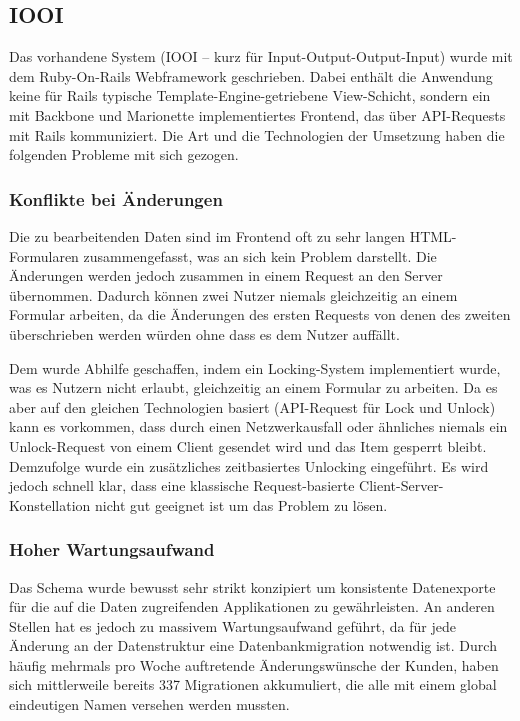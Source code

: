 \subsection{IOOI}
\label{ssec:ep_iooi}

Das vorhandene System (IOOI -- kurz für Input-Output-Output-Input) wurde mit
dem Ruby-On-Rails Webframework geschrieben.  Dabei enthält die Anwendung keine
für Rails typische Template-Engine-getriebene View-Schicht, sondern ein mit
Backbone und Marionette \cite{marionette} implementiertes Frontend, das über
API-Requests mit Rails kommuniziert.  Die Art und die Technologien der Umsetzung
haben die folgenden Probleme mit sich gezogen.

\subsubsection{Konflikte bei Änderungen}
\label{sssec:epv_konflikte_bei_aenderungen}

Die zu bearbeitenden Daten sind im Frontend oft zu sehr langen HTML-Formularen
zusammengefasst, was an sich kein Problem darstellt.  Die Änderungen werden
jedoch zusammen in einem Request an den Server übernommen.  Dadurch können zwei
Nutzer niemals gleichzeitig an einem Formular arbeiten, da die Änderungen des
ersten Requests von denen des zweiten überschrieben werden würden ohne dass es
dem Nutzer auffällt.

Dem wurde Abhilfe geschaffen, indem ein Locking-System implementiert wurde, was
es Nutzern nicht erlaubt, gleichzeitig an einem Formular zu arbeiten.  Da es
aber auf den gleichen Technologien basiert (API-Request für Lock und Unlock)
kann es vorkommen, dass durch einen Netzwerkausfall oder ähnliches niemals ein
Unlock-Request von einem Client gesendet wird und das Item gesperrt bleibt.
Demzufolge wurde ein zusätzliches zeitbasiertes Unlocking eingeführt.  Es wird
jedoch schnell klar, dass eine klassische Request-basierte
Client-Server-Konstellation nicht gut geeignet ist um das Problem zu lösen.

\subsubsection{Hoher Wartungsaufwand}
\label{sssec:epv_hoher_wartungsaufwand}

Das Schema wurde bewusst sehr strikt konzipiert um konsistente Datenexporte für
die auf die Daten zugreifenden Applikationen zu gewährleisten.  An anderen
Stellen hat es jedoch zu massivem Wartungsaufwand geführt, da für jede Änderung
an der Datenstruktur eine Datenbankmigration notwendig ist.  Durch häufig
mehrmals pro Woche auftretende Änderungswünsche der Kunden, haben sich
mittlerweile bereits 337 Migrationen akkumuliert, die alle mit einem global
eindeutigen Namen versehen werden mussten.

